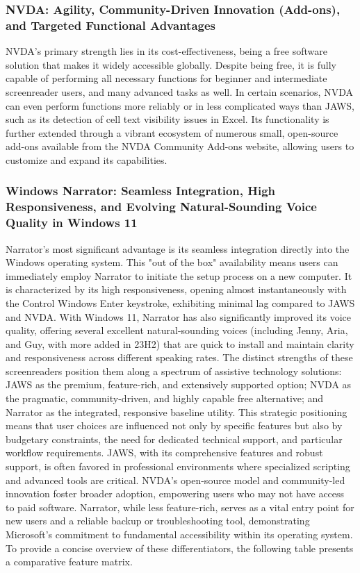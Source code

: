 \subsubsection{NVDA: Agility, Community-Driven Innovation (Add-ons), and Targeted Functional Advantages}
NVDA's primary strength lies in its cost-effectiveness, being a free software solution that makes it widely accessible globally.\supercite{kingsbury2025} Despite being free, it is fully capable of performing all necessary functions for beginner and intermediate screenreader users, and many advanced tasks as well.\supercite{kingsbury2025} In certain scenarios, NVDA can even perform functions more reliably or in less complicated ways than JAWS, such as its detection of cell text visibility issues in Excel.\supercite{kingsbury2025} Its functionality is further extended through a vibrant ecosystem of numerous small, open-source add-ons available from the NVDA Community Add-ons website, allowing users to customize and expand its capabilities.\supercite{kingsbury2025}
\subsubsection{Windows Narrator: Seamless Integration, High Responsiveness, and Evolving Natural-Sounding Voice Quality in Windows 11}
Narrator's most significant advantage is its seamless integration directly into the Windows operating system. This "out of the box" availability means users can immediately employ Narrator to initiate the setup process on a new computer.\supercite{kingsbury2025} It is characterized by its high responsiveness, opening almost instantaneously with the Control Windows Enter keystroke, exhibiting minimal lag compared to JAWS and NVDA.\supercite{kingsbury2025} With Windows 11, Narrator has also significantly improved its voice quality, offering several excellent natural-sounding voices (including Jenny, Aria, and Guy, with more added in 23H2) that are quick to install and maintain clarity and responsiveness across different speaking rates.\supercite{kingsbury2025}
The distinct strengths of these screenreaders position them along a spectrum of assistive technology solutions: JAWS as the premium, feature-rich, and extensively supported option; NVDA as the pragmatic, community-driven, and highly capable free alternative; and Narrator as the integrated, responsive baseline utility. This strategic positioning means that user choices are influenced not only by specific features but also by budgetary constraints, the need for dedicated technical support, and particular workflow requirements. JAWS, with its comprehensive features and robust support, is often favored in professional environments where specialized scripting and advanced tools are critical. NVDA's open-source model and community-led innovation foster broader adoption, empowering users who may not have access to paid software. Narrator, while less feature-rich, serves as a vital entry point for new users and a reliable backup or troubleshooting tool, demonstrating Microsoft's commitment to fundamental accessibility within its operating system.
To provide a concise overview of these differentiators, the following table presents a comparative feature matrix.

